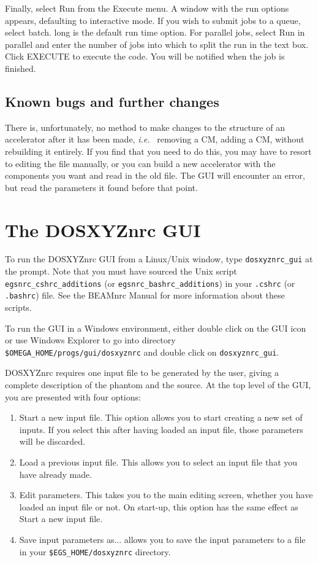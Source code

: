 \documentclass[12pt,twoside]{article}
\newcommand{\ie}{{\em i.e.}}
\begin{document}
Finally, select {\sf Run} from the {\sf Execute} menu.  A window with
the run options appears, defaulting to interactive mode.  If you wish to
submit jobs to a queue, select {\sf batch}. {\sf long} is the default
run time option.  For parallel jobs, select {\sf Run in parallel} and
enter the number of jobs into which to split the run in the text box.
Click {\sf EXECUTE} to execute the code.  You will be notified when the
job is finished.

\subsection{Known bugs and further changes}

There is, unfortunately, no method to make changes to the structure
of an accelerator after it has been made, \ie~ removing a CM, adding a
CM, without rebuilding it entirely.  If you find that you need to do
this, you may have to resort to editing the file manually, or you can build a new
accelerator with the components you want and read in the old file.  The
GUI will encounter an error, but
read the parameters it found before that point.


\section{The DOSXYZnrc GUI}

To run the DOSXYZnrc GUI from a Linux/Unix window, type {\tt dosxyznrc\_gui}
at the prompt. Note that you must have sourced the Unix script
{\tt egsnrc\_cshrc\_additions} (or {\tt egsnrc\_bashrc\_additions}) in
your {\tt .cshrc} (or {\tt .bashrc}) file.  See the BEAMnrc Manual\cite{Ro04a}
for more information about these scripts.

To run the GUI in a Windows environment, either double click on
the GUI icon or use Windows Explorer to go into directory
{\tt \$OMEGA\_HOME/progs/gui/dosxyznrc} and double click on
{\tt dosxyznrc\_gui}.

DOSXYZnrc requires one input file to be generated by the user, giving a
complete description of the phantom and the source.  At the top level of
the GUI, you are presented with four options:
\begin{enumerate}
\item {\sf Start a new input file}.  This option allows you to start
creating a new set of inputs.  If you select this after having loaded an
input file, those parameters will be discarded.
\item {\sf Load a previous input file}.  This allows you
to select an input file that you have already made.
\item {\sf Edit parameters}.  This takes you to the main editing screen,
whether you
have loaded an input file or not.  On start-up, this option has the same
effect as {\sf Start a new input file}.
\item {\sf Save input parameters as...} allows you to save the input parameters
to a file in your {\tt \$EGS\_HOME/dosxyznrc} directory.

\end{enumerate}
\end{document}

